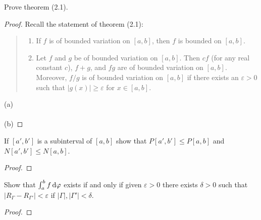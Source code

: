 \begin{problem}
Prove theorem (2.1).
\end{problem}
\begin{proof}
Recall the statement of theorem (2.1):
\begin{quote}
\begin{enumerate}[label=(\alph*),noitemsep]
\item If $f$ is of bounded variation on $[a,b]$, then $f$ is bounded on
  $[a,b]$.
\item Let $f$ and $g$ be of bounded variation on $[a,b]$. Then $cf$ (for
  any real constant $c$), $f+g$, and $fg$ are of bounded variation on
  $[a,b]$. Moreover, $f/g$ is of bounded variation on $[a,b]$ if there
  exists an $\varepsilon>0$ such that $|g(x)|\geq\varepsilon$ for
  $x\in[a,b]$.
\end{enumerate}
\end{quote}
\noindent
(a)
\\\\
(b)
\end{proof}

\begin{problem}
If $[a',b']$ is a subinterval of $[a,b]$ show that $P[a',b']\leq P[a,b]$
and $N[a',b']\leq N[a,b]$.
\end{problem}
\begin{proof}
\end{proof}
\begin{problem}
Show that $\int_a^bf\mathop{}\!\mathrm{d}\varphi$ exists if and only if given $\varepsilon>0$
there exists $\delta>0$ such that
$\left|R_\Gamma-R_{\Gamma'}\right|<\varepsilon$ if
$|\Gamma|,|\Gamma'|<\delta$.
\end{problem}
\begin{proof}
\end{proof}

